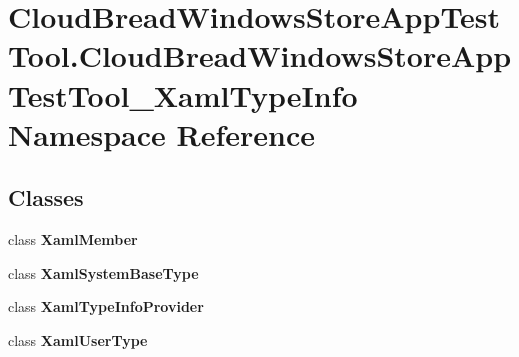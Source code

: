 \hypertarget{namespace_cloud_bread_windows_store_app_test_tool_1_1_cloud_bread_windows_store_app_test_tool___xaml_type_info}{}\section{Cloud\+Bread\+Windows\+Store\+App\+Test\+Tool.\+Cloud\+Bread\+Windows\+Store\+App\+Test\+Tool\+\_\+\+Xaml\+Type\+Info Namespace Reference}
\label{namespace_cloud_bread_windows_store_app_test_tool_1_1_cloud_bread_windows_store_app_test_tool___xaml_type_info}
\subsection*{Classes}
\begin{DoxyCompactItemize}
\item 
class {\bfseries Xaml\+Member}
\item 
class {\bfseries Xaml\+System\+Base\+Type}
\item 
class {\bfseries Xaml\+Type\+Info\+Provider}
\item 
class {\bfseries Xaml\+User\+Type}
\end{DoxyCompactItemize}
